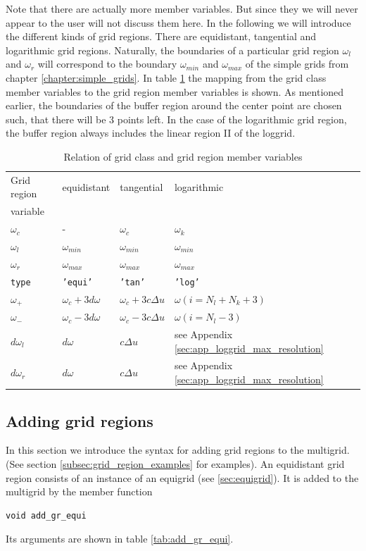 Note that there are actually more member variables. But since they we will never appear to the user will not discuss them here. In the following we will introduce the different kinds of grid regions. There are equidistant, tangential and logarithmic grid regions. Naturally, the boundaries of a particular grid region $\omega_l$ and $\omega_r$ will correspond to the boundary $\omega_{min}$ and $\omega_{max}$ of the simple grids from chapter \ref{chapter:simple_grids}. In table \ref{tab:grid_region_types} the mapping from the grid class member variables to the grid region member variables is shown. As mentioned earlier, the boundaries of the buffer region around the center point are chosen such, that there will be 3 points left. In the case of the logarithmic grid region, the buffer region always includes the linear region II of the loggrid.
\begin{table}[h]
	\begin{center}
		\begin{tabular}{llll}
		Grid region & equidistant & tangential & logarithmic  \\ 
		variable    &             &            &              \\
		\hline 
		$\omega_c$    & -               & $\omega_c$     & $\omega_k$     \\
		$\omega_l$    & $\omega_{min}$  & $\omega_{min}$ & $\omega_{min}$ \\
		$\omega_r$    & $\omega_{max}$  & $\omega_{max}$ & $\omega_{max}$ \\
		\texttt{type} & \texttt{'equi'} & \texttt{'tan'} & \texttt{'log'} \\
		$\omega_+$         & $\omega_c+3d\omega$ & $\omega_c+3c\Delta u$ & $\omega(i=N_l+N_k+3)$ \\
		$\omega_-$         & $\omega_c-3d\omega$ & $\omega_c-3c\Delta u$ & $\omega(i=N_l-3)$  \\
		$d\omega_l$  & $d\omega$ & $c\Delta u$ & see Appendix \ref{sec:app_loggrid_max_resolution} \\
		$d\omega_r$  & $d\omega$ & $c\Delta u$ & see Appendix \ref{sec:app_loggrid_max_resolution} \\
		\end{tabular}
	\end{center}
	\caption{Relation of grid class and grid region member variables}
	\label{tab:grid_region_types}
\end{table}

\subsection{Adding grid regions}\label{subsec:grid_region_adding}
In this section we introduce the syntax for adding grid regions to the multigrid. (See section \ref{subsec:grid_region_examples} for examples).
An equidistant grid region consists of an instance of an equigrid (see \ref{sec:equigrid}). It is added to the multigrid by the member function 
\begin{lstlisting}
void add_gr_equi
\end{lstlisting}
Its arguments are shown in table \ref{tab:add_gr_equi}.

